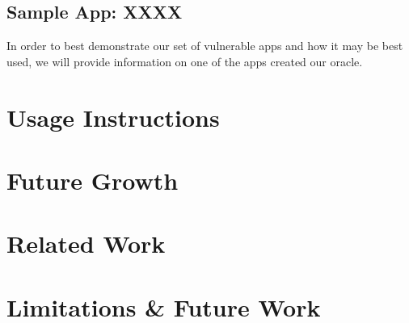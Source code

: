 \documentclass{sig-alternate-05-2015}
\begin{document}
\subsection{Sample App: XXXX}

In order to best demonstrate our set of vulnerable apps and how it may be best used, we will provide information on one of the apps created our oracle.



\section{Usage Instructions} %
\label{sec:usage}





\section{Future Growth} %
\label{sec:futuregrowth}


%	


\section{Related Work}
\label{sec:relatedworks}

%	



\section{Limitations \& Future Work}
\label{sec:futurework}


%	
\end{document}
